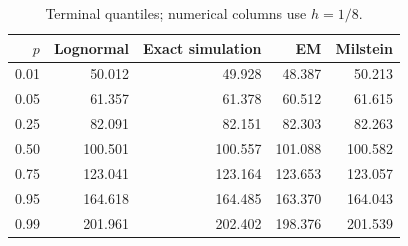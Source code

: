 \begin{table}[H]\centering\small
\caption{Terminal quantiles; numerical columns use $h=1/8$.}
\begin{tabular}{rrrrr}\toprule
$p$ & Lognormal & Exact simulation & EM & Milstein\\\midrule
0.01 & 50.012 & 49.928 & 48.387 & 50.213\\
0.05 & 61.357 & 61.378 & 60.512 & 61.615\\
0.25 & 82.091 & 82.151 & 82.303 & 82.263\\
0.50 & 100.501 & 100.557 & 101.088 & 100.582\\
0.75 & 123.041 & 123.164 & 123.653 & 123.057\\
0.95 & 164.618 & 164.485 & 163.370 & 164.043\\
0.99 & 201.961 & 202.402 & 198.376 & 201.539\\
\bottomrule\end{tabular}
\end{table}
